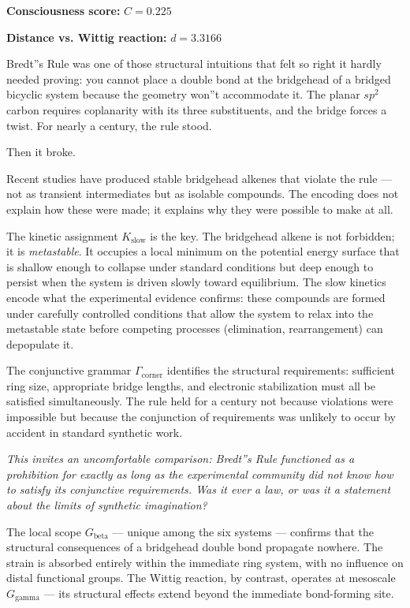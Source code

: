 \documentclass[12pt,a4paper]{article}
\begin{document}
\textbf{Consciousness score:} $C = 0.225$

\textbf{Distance vs. Wittig reaction:} $d = 3.3166$

Bredt''s Rule was one of those structural intuitions that felt so right it hardly needed proving: you cannot place a double bond at the bridgehead of a bridged bicyclic system because the geometry won''t accommodate it. The planar $sp^2$ carbon requires coplanarity with its three substituents, and the bridge forces a twist. For nearly a century, the rule stood.

Then it broke.

Recent studies have produced stable bridgehead alkenes that violate the rule --- not as transient intermediates but as isolable compounds. The encoding does not explain how these were made; it explains why they were possible to make at all.

The kinetic assignment $K_\textrm{slow}$ is the key. The bridgehead alkene is not forbidden; it is \emph{metastable}. It occupies a local minimum on the potential energy surface that is shallow enough to collapse under standard conditions but deep enough to persist when the system is driven slowly toward equilibrium. The slow kinetics encode what the experimental evidence confirms: these compounds are formed under carefully controlled conditions that allow the system to relax into the metastable state before competing processes (elimination, rearrangement) can depopulate it.

The conjunctive grammar $\Gamma_{\text{corner}}$ identifies the structural requirements: sufficient ring size, appropriate bridge lengths, and electronic stabilization must all be satisfied simultaneously. The rule held for a century not because violations were impossible but because the conjunction of requirements was unlikely to occur by accident in standard synthetic work.

\emph{This invites an uncomfortable comparison: Bredt''s Rule functioned as a prohibition for exactly as long as the experimental community did not know how to satisfy its conjunctive requirements. Was it ever a law, or was it a statement about the limits of synthetic imagination?}

The local scope $G_{\text{beta}}$ --- unique among the six systems --- confirms that the structural consequences of a bridgehead double bond propagate nowhere. The strain is absorbed entirely within the immediate ring system, with no influence on distal functional groups. The Wittig reaction, by contrast, operates at mesoscale $G_{\text{gamma}}$ --- its structural effects extend beyond the immediate bond-forming site.
\end{document}
